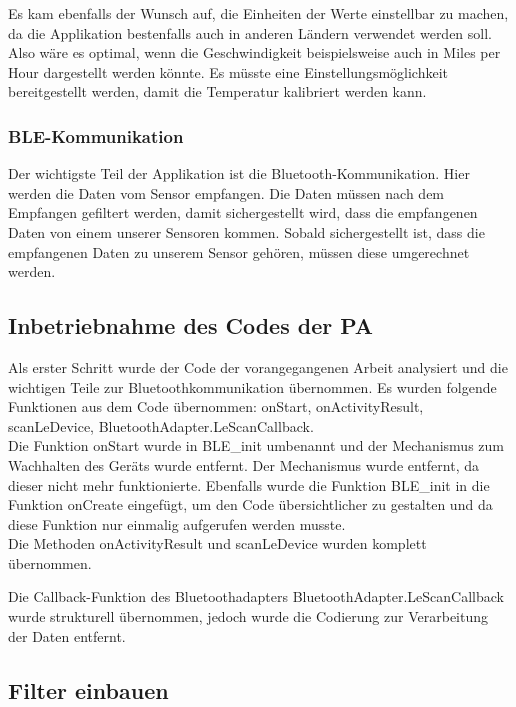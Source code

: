 Es kam ebenfalls der Wunsch auf, die Einheiten der Werte einstellbar zu machen, da die Applikation bestenfalls auch in anderen Ländern verwendet werden soll. Also wäre es optimal, wenn die Geschwindigkeit beispielsweise auch in Miles per Hour dargestellt werden könnte. Es müsste eine Einstellungsmöglichkeit bereitgestellt werden, damit die Temperatur kalibriert werden kann.

\subsubsection{BLE-Kommunikation}

Der wichtigste Teil der Applikation ist die Bluetooth-Kommunikation. Hier werden die Daten vom Sensor empfangen. Die Daten müssen nach dem Empfangen gefiltert werden, damit sichergestellt wird, dass die empfangenen Daten von einem unserer Sensoren kommen. Sobald sichergestellt ist, dass die empfangenen Daten zu unserem Sensor gehören, müssen diese umgerechnet werden.

\subsection{Inbetriebnahme des Codes der PA}

Als erster Schritt wurde der Code der vorangegangenen Arbeit analysiert und die wichtigen Teile zur Bluetoothkommunikation übernommen. Es wurden folgende Funktionen aus dem Code übernommen: onStart, onActivityResult, scanLeDevice, BluetoothAdapter.LeScanCallback.\\

Die Funktion onStart wurde in BLE\_init umbenannt und der Mechanismus zum Wachhalten des Geräts wurde entfernt. Der Mechanismus wurde entfernt, da dieser nicht mehr funktionierte. Ebenfalls wurde die Funktion BLE\_init in die Funktion onCreate eingefügt, um den Code übersichtlicher zu gestalten und da diese Funktion nur einmalig aufgerufen werden musste.\\
 
Die Methoden onActivityResult und scanLeDevice wurden komplett übernommen.

Die Callback-Funktion des Bluetoothadapters BluetoothAdapter.LeScanCallback wurde strukturell übernommen, jedoch wurde die Codierung zur Verarbeitung der Daten entfernt.

\subsection{Filter einbauen}

